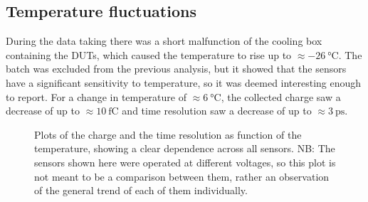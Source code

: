 \FloatBarrier

\subsection{Temperature fluctuations}\label{sec:temperature_fluctuations}

During the data taking there was a short malfunction of the cooling box containing the DUTs, which caused the temperature to rise up to \(\approx\qty{-26}{\degreeCelsius}\). The  batch was excluded from the previous analysis, but it showed that the sensors have a significant sensitivity to temperature, so it was deemed interesting enough to report. For a change in temperature of \(\approx\qty{6}{\degreeCelsius}\), the collected charge saw a decrease of up to \(\approx\qty{10}{\femto\coulomb}\) and time resolution saw a decrease of up to \(\approx\qty{3}{\pico\second}\).

\begin{figure}[h!tbp]
    \centering
    \begin{minipage}[c]{.49\linewidth}
        \end{minipage}
        \hfill
        \begin{minipage}[c]{.49\linewidth}
    \end{minipage}
    \vfill
    \begin{minipage}[c]{.49\linewidth}
        \end{minipage}
        \hfill
        \begin{minipage}[c]{.49\linewidth}
        \end{minipage}
    
    \captionsetup{width=\captionwidth}
    \caption{Plots of the charge and the time resolution as function of the temperature, showing a clear dependence across all sensors. NB: The sensors shown here were operated at different voltages, so this plot is not meant to be a comparison between them, rather an observation of the general trend of each of them individually.}
\end{figure}

